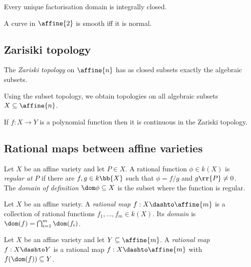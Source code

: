 \documentclass{article}
\begin{document}
\begin{proposition}
  Every unique factorisation domain is integrally closed.
\end{proposition}

\begin{theorem}[Zariski]
  A curve in $\affine{2}$ is smooth iff it is normal.
\end{theorem}

\subsection{Zarisiki topology}

\begin{definition}
  The \emph{Zariski topology} on $\affine{n}$ has as closed subsets exactly the algebraic
  subsets.

  Using the subset topology, we obtain topologies on all algebraic subsets $X\subseteq \affine{n}$.
\end{definition}

\begin{proposition}
  If $f:X\to Y$ is a polynomial function then it is continuous in the Zariski topology.
\end{proposition}

\subsection{Rational maps between affine varieties}

\begin{definition}
  Let $X$ be an affine variety and let $P\in X$. A rational function $\phi\in k(X)$ is
  \emph{regular at $P$} if there are $f,g\in k\bb{X}$ such that $\phi = f/g$ and $g\rr{P}\neq 0$.
  The \emph{domain of definition} $\dom\phi\subseteq X$ is the subset where the function
  is regular.
\end{definition}

\begin{definition}
  Let $X$ be an affine variety. A \emph{rational map $f:X\dashto\affine{m}$} is a collection of
  rational functions $f_1,\ldots,f_m\in k(X)$. Its \emph{domain} is
  $\dom(f) = \bigcap_{i = 1}^m \dom(f_i)$.
\end{definition}

\begin{definition}
  Let $X$ be an affine variety and let $Y\subseteq\affine{m}$. A \emph{rational map}
  $f:X\dashto Y$ is a rational map $f:X\dashto\affine{m}$ with $f(\dom(f))\subseteq Y$.
\end{definition}
\end{document}
